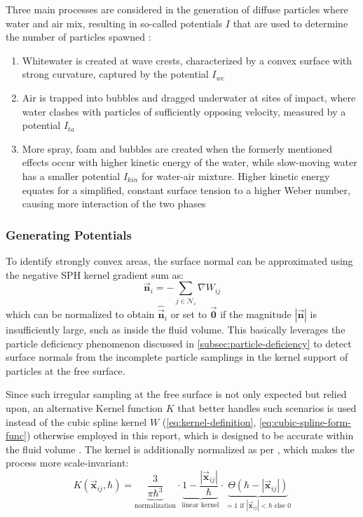 \documentclass[oneside, a4paper]{book}
\newcounter{phase}[algorithm]
\newcommand\abs[1]{\left|#1\right|}
\newcommand\vek[1]{\vec{\bm{#1}}}
\newcommand\br[1]{\left(#1\right)}
\begin{document}
  Three main processes are considered in the generation of diffuse particles where water and air mix, resulting in so-called potentials $I$ that are used to determine the number of particles spawned \autocite{spray-foam-bubbles}:
  \begin{enumerate}
    \item Whitewater is created at wave crests, characterized by a convex surface with strong curvature, captured by the potential $I_{wc}$
    \item Air is trapped into bubbles and dragged underwater at sites of impact, where water clashes with particles of sufficiently opposing velocity, measured by a potential $I_{ta}$
    \item More spray, foam and bubbles are created when the formerly mentioned effects occur with higher kinetic energy of the water, while slow-moving water has a smaller potential $I_{kin}$ for water-air mixture. Higher kinetic energy equates for a simplified, constant surface tension to a higher Weber number, causing more interaction of the two phases \autocite{spray-foam-bubbles}
  \end{enumerate}

  \subsubsection{Generating Potentials}
  To identify strongly convex areas, the surface normal can be approximated using the negative SPH kernel gradient sum as:
  \begin{equation}
    \vek{n}_i = - \sum_{j\in\mathcal{N}_i} \nabla W_{ij}
  \end{equation}
  which can be normalized to obtain $\hat{\vek{n}}_i$ or set to $\vek{0}$ if the magnitude $\abs{\vek{n}}$ is insufficiently large, such as inside the fluid volume. This basically leverages the particle deficiency phenomenon discussed in \autoref{subsec:particle-deficiency} to detect surface normals from the incomplete particle samplings in the kernel support of particles at the free surface. 

  Since such irregular sampling at the free surface is not only expected but relied upon, an alternative Kernel function $K$ that better handles such scenarios is used instead of the cubic spline kernel $W$ (\autoref{eq:kernel-definition}, \autoref{eq:cubic-spline-form-func}) otherwise employed in this report, which is designed to be accurate within the fluid volume \autocite{spray-foam-bubbles}. The kernel is additionally normalized as per \autocite[later suggestions]{turbulent-micropolar-foam}, which makes the process more scale-invariant:
  \begin{equation}\label{eq:k-kernel-def}
    K\br{\vek{x}_{ij}, \hbar} = 
    \underbrace{ \frac{3}{\pi\hbar^3}}_{\text{normalization}} \cdot 
    \underbrace{1-\frac{\abs{\vek{x}_{ij}}}{\hbar}}_{\text{linear kernel}} \cdot 
   \underbrace{ \Theta\br{\hbar-\abs{\vek{x}_{ij}}}}_{= 1 \text{ if } \abs{\vek{x}_{ij}}<\hbar \text{ else } 0}
  \end{equation}
\end{document}
